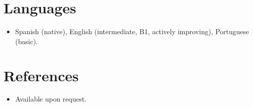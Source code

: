 \documentclass[11pt,a4paper,sans]{moderncv}
\begin{document}

\section{Languages}
\vspace{1pt}
\begin{itemize}
\item {Spanish (native), English (intermediate, B1, actively improving), Portuguese (basic).}
\end{itemize}


\section{References}
\vspace{1pt}
\begin{itemize}
\item{Available upon request.}
\end{itemize}
\end{document}
